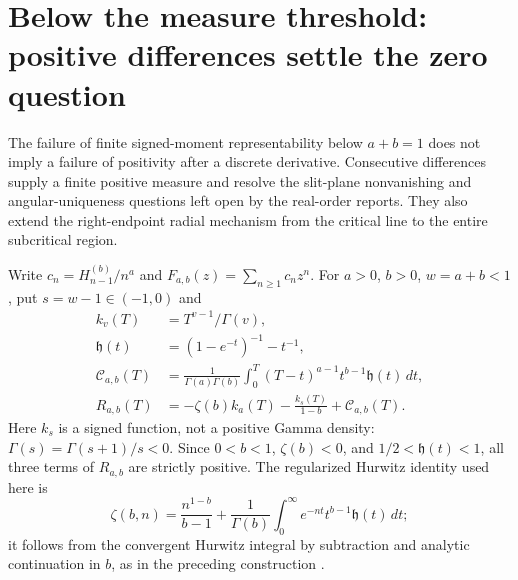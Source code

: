 \section{Below the measure threshold: positive differences settle the zero question}
\label{subpick:sec:main}
The failure of finite signed-moment representability below $a+b=1$
does not imply a failure of positivity after a discrete derivative.
Consecutive differences supply a finite positive measure and resolve
the slit-plane nonvanishing and angular-uniqueness questions left open
by the real-order reports. They also extend the right-endpoint radial
mechanism from the critical line to the entire subcritical region.

Write $c_n=H_{n-1}^{(b)}/n^a$ and $F_{a,b}(z)=\sum_{n\ge1}c_nz^n$.
For $a>0$, $b>0$, $w=a+b<1$, put $s=w-1\in(-1,0)$ and
\begin{align}
 k_v(T)&=T^{v-1}/\Gamma(v),\\
 \mathfrak h(t)&=(1-e^{-t})^{-1}-t^{-1},\\
 \mathcal C_{a,b}(T)&=\frac1{\Gamma(a)\Gamma(b)}
  \int_0^T(T-t)^{a-1}t^{b-1}\mathfrak h(t)\,dt,\\
 R_{a,b}(T)&=-\zeta(b)k_a(T)-\frac{k_s(T)}{1-b}
                +\mathcal C_{a,b}(T).\label{subpick:eq:R}
\end{align}
Here $k_s$ is a signed function, not a positive Gamma density:
$\Gamma(s)=\Gamma(s+1)/s<0$. Since $0<b<1$, $\zeta(b)<0$,
and $1/2<\mathfrak h(t)<1$, all three terms of $R_{a,b}$ are
strictly positive. The regularized Hurwitz identity used here is
\[
 \zeta(b,n)=\frac{n^{1-b}}{b-1}
 +\frac1{\Gamma(b)}\int_0^\infty e^{-nt}t^{b-1}\mathfrak h(t)\,dt;
\]
it follows from the convergent Hurwitz integral by subtraction and
analytic continuation in $b$, as in the preceding construction
\cite{intdist:DLMFHurwitz}.

